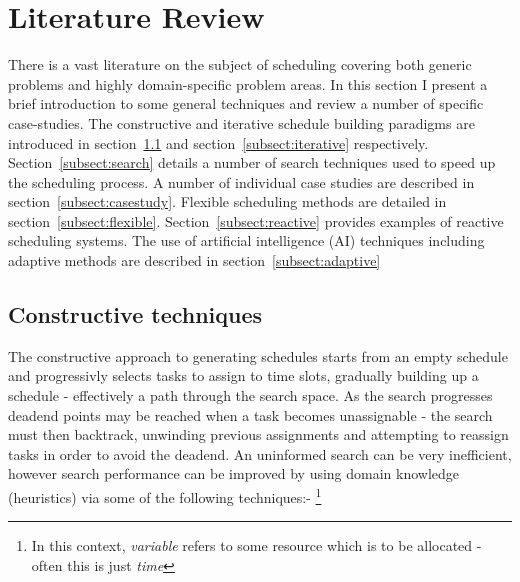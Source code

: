 \documentclass[12pt,a4paper]{article}
\begin{document}
\newpage
\section{Literature Review}

There is a vast literature on the subject of scheduling covering both generic problems and highly domain-specific problem areas. In this section I present a brief introduction to some general techniques and review a number of specific case-studies. The constructive and iterative schedule building paradigms are introduced in section~\ref{subsect:constructive} and section~\ref{subsect:iterative} respectively. Section~\ref{subsect:search} details a number of search techniques used to speed up the scheduling process. A number of individual case studies are described in section~\ref{subsect:casestudy}. Flexible scheduling methods are detailed in section~\ref{subsect:flexible}. Section~\ref{subsect:reactive} provides examples of reactive scheduling systems. The use of artificial intelligence (AI) techniques including adaptive methods are described in section~\ref{subsect:adaptive} 

\subsection{Constructive techniques}
\label{subsect:constructive}
The constructive approach to generating schedules starts from an empty schedule and progressivly selects tasks to assign to time slots, gradually building up a schedule - effectively a path through the search space. As the search progresses deadend points may be reached when a task becomes unassignable - the search must then backtrack, unwinding previous assignments and attempting to reassign tasks in order to avoid the deadend. An uninformed search can be very inefficient, however search performance can be improved by using domain knowledge (heuristics) via some of the following techniques:- \footnote{In this context, \emph{variable} refers to some resource which is to be allocated - often this is just \emph{time}}
\end{document}
